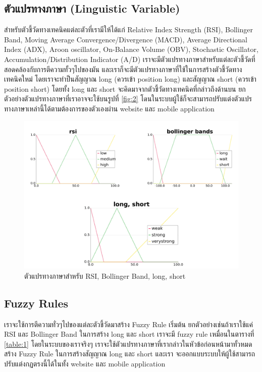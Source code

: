 \subsection{ตัวแปรทางภาษา (Linguistic Variable)}
สำหรับตัวชี้วัดทางเทคนิคแต่ละตัวที่เรามีให้ได้แก่ Relative Index Strength (RSI), Bollinger Band, Moving Average Convergence/Divergence 
(MACD), Average Directional Index (ADX), Aroon oscillator, On-Balance Volume (OBV), Stochastic Oscillator, 
Accumulation/Distribution Indicator (A/D) เราจะมีตัวแปรทางภาษาสำหรับแต่ละตัวชี้วัดที่สอดคล้องกับการตีความทั้วๆไปของมัน
และเราก็จะมีตัวแปรทางภาษาที่ใช้ในการสร้างตัวชี้วัดทางเทคนิคใหม่ โดยเราจะทำป็นสัญญาณ long (ควรเข้า position long) และสัญญาณ short (ควรเข้า position short) โดยทั้ง long และ short
จะคิดมาจากตัวชี้วัดทางเทคนิคที่กล่าวถึงด้านบน ยกตัวอย่างตัวแปรทางภาษาที่เราอาจจะใช้บนรูปที่ \ref{fig:2} โดนในระบบผู้ใช้ก็จะสามารถปรับแต่งตัวแปรทางภาษาเหล่านี้ได้ตามต้องการของตัวเองผ่าน website 
และ mobile application

\begin{figure}[ht]
    \centering
    \includegraphics[width=\textwidth]{images/linguistic.png}
    \caption{ตัวแปรทางภาษาสำหรับ RSI, Bollinger Band, long, short}
    \label{fig:8}
\end{figure}

\subsection{Fuzzy Rules}
เราจะใช้การตีความทั่วๆไปของแต่ละตัวชี้วัดมาสร้าง Fuzzy Rule เริ่มต้น ยกตัวอย่างเช่นถ้าเราใช้แค่ RSI และ Bollinger Band ในการสร้าง long และ short เราจะมี fuzzy rule 
เหมื่อนในตารางที่ \ref{table:1} โดยในระบบของเราจริงๆ เราจะใช้ตัวแปรทางภาษาที่เรากล่าวในหัวข้อก่อนหน้ามาทั้วหมดสร้าง Fuzzy Rule ในการสร้างสัญญาณ long และ short และเรา
จะออกแบบระบบให้ผู้ใช้สามารถปรับแต่งกฏตรงนี้ได้ในทั้ง website และ mobile application

